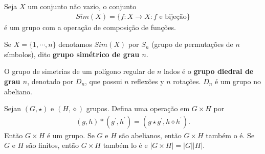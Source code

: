 \begin{example}
  Seja $X$ um conjunto não vazio, o conjunto
  \begin{align*}
    Sim(X)=\{f:X\to X : f\text{ e bijeção}\}
  \end{align*}
  é um grupo com a operação de composição de funções. 
\end{example}
\begin{note}[$S_n$]
  Se $X=\{1,\cdots,n\}$ denotamos $Sim(X)$ por $S_n$ (grupo de permutações de $n$ símbolos), dito \textbf{ grupo simétrico de grau $n$}. 
\end{note}
\begin{example}[$D_n$]
  O grupo de simetrias de um polígono regular de $n$ lados é o \textbf{grupo diedral de grau $n$}, denotado por $D_n$, que possui $n$ reflexões y $n$ rotações. $D_n$ é um grupo no abeliano. 
\end{example}
\begin{example}
  Sejan $(G,\star)$ e $(H,\diamond)$ grupos. Defina uma operação em $G\times H$ por
  \begin{align*}
    (g,h)*(g^{\prime},h^{\prime})=(g\star g^{\prime},h\diamond h^{\prime}).
  \end{align*}
  Então $G\times H$ é um grupo. Se $G$ e $H$ são abelianos, então $G\times H$ também o é. Se $G$ e $H$ são finitos, então $G\times H$ também lo é e $|G\times H|=|G||H|$. 
\end{example}
